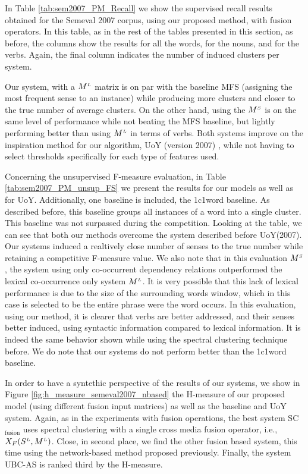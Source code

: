 In Table \ref{tab:sem2007_PM_Recall}  we show the supervised recall results obtained for the Semeval 2007 corpus, using our proposed method, with fusion operators. In this table, as in the rest of the tables presented in this section, as before, the columns show the results for all the words, for the nouns, and for the verbs. Again, the final column indicates the number of induced clusters per system. 

Our system, with a  $M^{\scriptscriptstyle L}$ matrix is on par with the baseline MFS (assigning the most frequent sense to an instance) while producing more clusters and closer to the true number of average clusters. On the other hand, using the $M^{\scriptscriptstyle S}$ is on the same level of performance while not beating the MFS baseline, but lightly performing better than using $M^{\scriptscriptstyle L}$ in terms of verbs. Both systems improve on the inspiration method for our algorithm,  UoY (version 2007) \cite{2007.Klapaftis.UOY}, while not having to select thresholds specifically for each type of features used.


Concerning the unsupervised F-measure evaluation, in Table \ref{tab:sem2007_PM_unsup_FS} we present the results for our models as well as for UoY. Additionally, one baseline is included, the 1c1word baseline. As described before, this baseline  groups all instances of a word into a single cluster. This baseline was not surpassed during the competition. Looking at the table, we can see that both our methods overcome the system described before {UoY(2007)}. Our systems induced a realtively close number of senses to the true number while retaining a competitive F-measure value. We also note that in this evaluation $M^{\scriptscriptstyle S}$, the system using only co-occurrent dependency relations outperformed the lexical co-occurrence only system $M^{\scriptscriptstyle L}$. It is very possible that this lack of lexical performance is due to the size of the surrounding words window, which in this case is selected to be the entire phrase were the word occurs. In this evaluation, using our method,  it is clearer that  verbs are  better addressed, and their senses better induced, using syntactic information compared to lexical information. It is indeed the same behavior shown while using the spectral clustering technique before.  We do note that our systems do not perform better than the 1c1word baseline. 


In order to have a syntethic perspective of the results of our systems, we show in Figure \ref{fig:h_measure_semeval2007_nbased} the H-measure of our proposed model (using different fusion input matrices) as well as the baseline and UoY system. Again, as in the experiments with fusion operations, the best system SC$_{\text{fusion}}$ uses spectral clustering with a single cross media fusion operator, i.e., $X_F(S^{\scriptscriptstyle L},M^{\scriptscriptstyle L})$. Close, in second place, we find the other fusion based system, this time using the network-based method proposed previously. Finally, the system UBC-AS  is ranked third by the H-measure.

